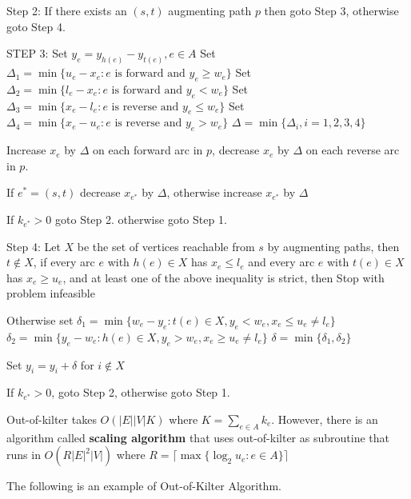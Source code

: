 			Step 2: If there exists an $(s, t)$ augmenting path $p$ then goto Step 3, otherwise goto Step 4.

			STEP 3: Set $y_e = y_{h(e)} - y_{t(e)}, e\in A$
			Set $\Delta_1 = \min\{u_e - x_e: e \text{ is forward and } y_e \ge w_e\}$
			Set $\Delta_2 = \min\{l_e - x_e: e \text{ is forward and } y_e < w_e\}$
			Set $\Delta_3 = \min\{x_e - l_e: e \text{ is reverse and } y_e \le w_e\}$
			Set $\Delta_4 = \min\{x_e - u_e: e \text{ is reverse and } y_e > w_e\}$
			$\Delta = \min\{\Delta_i, i = 1, 2, 3, 4\}$

			Increase $x_e$ by $\Delta$ on each forward arc in $p$, decrease $x_e$ by $\Delta$ on each reverse arc in $p$.

			If $e^* = (s, t)$ decrease $x_{e^*}$ by $\Delta$, otherwise increase $x_{e^*}$ by $\Delta$

			If $k_{e^*} > 0$ goto Step 2. otherwise goto Step 1.

			Step 4: Let $X$ be the set of vertices reachable from $s$ by augmenting paths, then $t \notin X$, if every arc $e$ with $h(e) \in X$ has $x_e \le l_e$ and every arc $e$ with $t(e) \in X$ has $x_e \ge u_e$, and at least one of the above inequality is strict, then Stop with problem infeasible

			Otherwise set
			$\delta_1 = \min\{w_e - y_e: t(e) \in X, y_e < w_e, x_e \le u_e \neq l_e\}$
			$\delta_2 = \min\{y_e - w_e: h(e) \in X, y_e > w_e, x_e \ge u_e \neq l_e\}$
			$\delta = \min\{\delta_1, \delta_2\}$

			Set $y_i = y_i + \delta$ for $i \notin X$

			If $k_{e^*} > 0$, goto Step 2, otherwise goto Step 1.

			Out-of-kilter takes $O(|E||V|K)$ where $K = \sum_{e\in A} k_e$. However, there is an algorithm called \textbf{scaling algorithm} that uses out-of-kilter as subroutine that runs in $O(R|E|^2|V|)$ where $R = \lceil \max\{\log_2 u_e: e\in A\}\rceil$

			\onecolumn
			The following is an example of Out-of-Kilter Algorithm.

